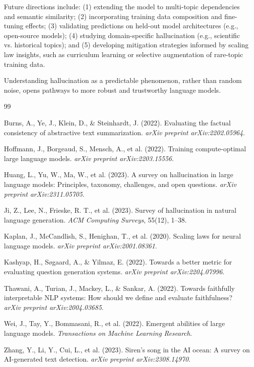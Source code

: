 \documentclass[11pt,a4paper]{article}
\begin{document}
Future directions include: (1) extending the model to multi-topic dependencies and semantic similarity; (2) incorporating training data composition and fine-tuning effects; (3) validating predictions on held-out model architectures (e.g., open-source models); (4) studying domain-specific hallucination (e.g., scientific vs. historical topics); and (5) developing mitigation strategies informed by scaling law insights, such as curriculum learning or selective augmentation of rare-topic training data.

Understanding hallucination as a predictable phenomenon, rather than random noise, opens pathways to more robust and trustworthy language models.

\begin{thebibliography}{99}

Burns, A., Ye, J., Klein, D., \& Steinhardt, J. (2022).
Evaluating the factual consistency of abstractive text summarization.
\textit{arXiv preprint arXiv:2202.05964}.

Hoffmann, J., Borgeaud, S., Mensch, A., et al. (2022).
Training compute-optimal large language models.
\textit{arXiv preprint arXiv:2203.15556}.

Huang, L., Yu, W., Ma, W., et al. (2023).
A survey on hallucination in large language models: Principles, taxonomy, challenges, and open questions.
\textit{arXiv preprint arXiv:2311.05705}.

Ji, Z., Lee, N., Frieske, R. T., et al. (2023).
Survey of hallucination in natural language generation.
\textit{ACM Computing Surveys}, 55(12), 1--38.

Kaplan, J., McCandlish, S., Henighan, T., et al. (2020).
Scaling laws for neural language models.
\textit{arXiv preprint arXiv:2001.08361}.

Kashyap, H., Søgaard, A., \& Yilmaz, E. (2022).
Towards a better metric for evaluating question generation systems.
\textit{arXiv preprint arXiv:2204.07996}.

Thawani, A., Turian, J., Mackey, L., \& Sankar, A. (2022).
Towards faithfully interpretable NLP systems: How should we define and evaluate faithfulness?
\textit{arXiv preprint arXiv:2004.03685}.

Wei, J., Tay, Y., Bommasani, R., et al. (2022).
Emergent abilities of large language models.
\textit{Transactions on Machine Learning Research}.

Zhang, Y., Li, Y., Cui, L., et al. (2023).
Siren's song in the AI ocean: A survey on AI-generated text detection.
\textit{arXiv preprint arXiv:2308.14970}.

\end{thebibliography}
\end{document}
